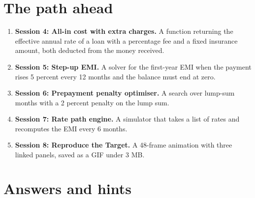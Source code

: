 \documentclass[11pt,a4paper]{article}
\begin{document}
\section{The path ahead}
\begin{enumerate}[nosep]
\item \textbf{Session 4: All-in cost with extra charges.} A function returning the effective annual rate of a loan with a percentage fee and a fixed insurance amount, both deducted from the money received.
\item \textbf{Session 5: Step-up EMI.} A solver for the first-year EMI when the payment rises 5 percent every 12 months and the balance must end at zero.
\item \textbf{Session 6: Prepayment penalty optimiser.} A search over lump-sum months with a 2 percent penalty on the lump sum.
\item \textbf{Session 7: Rate path engine.} A simulator that takes a list of rates and recomputes the EMI every 6 months.
\item \textbf{Session 8: Reproduce the Target.} A 48-frame animation with three linked panels, saved as a GIF under 3 MB.
\end{enumerate}

\section{Answers and hints}
\end{document}
